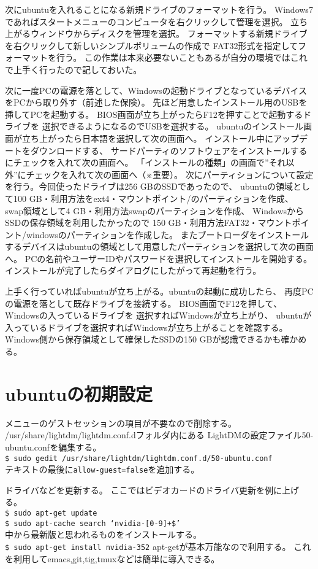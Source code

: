 次にubuntuを入れることになる新規ドライブのフォーマットを行う。
Windows7であればスタートメニューのコンピュータを右クリックして管理を選択。
立ち上がるウィンドウからディスクを管理を選択。
フォーマットする新規ドライブを右クリックして新しいシンプルボリュームの作成で
FAT32形式を指定してフォーマットを行う。
この作業は本来必要ないこともあるが自分の環境ではこれで上手く行ったので記しておいた。

次に一度PCの電源を落として、Windowsの起動ドライブとなっているデバイスをPCから取り外す（前述した保険）。
先ほど用意したインストール用のUSBを挿してPCを起動する。
BIOS画面が立ち上がったらF12を押すことで起動するドライブを
選択できるようになるのでUSBを選択する。
ubuntuのインストール画面が立ち上がったら日本語を選択して次の画面へ。
インストール中にアップデートをダウンロードする、
サードパーティのソフトウェアをインストールするにチェックを入れて次の画面へ。
「インストールの種類」の画面で''それ以外''にチェックを入れて次の画面へ（※重要）。
次にパーティションについて設定を行う。今回使ったドライブは256 GBのSSDであったので、
ubuntuの領域として100 GB・利用方法をext4・マウントポイント/のパーティションを作成、
swap領域として4 GB・利用方法swapのパーティションを作成、
WindowsからSSDの保存領域を利用したかったので
150 GB・利用方法FAT32・マウントポイント/windowsのパーティションを作成した。
またブートローダをインストールするデバイスはubuntuの領域として用意したパーティションを選択して次の画面へ。
PCの名前やユーザーIDやパスワードを選択してインストールを開始する。
インストールが完了したらダイアログにしたがって再起動を行う。

上手く行っていればubuntuが立ち上がる。ubuntuの起動に成功したら、
再度PCの電源を落として既存ドライブを接続する。
BIOS画面でF12を押して、Windowsの入っているドライブを
選択すればWindowsが立ち上がり、
ubuntuが入っているドライブを選択すればWindowsが立ち上がることを確認する。
Windows側から保存領域として確保したSSDの150 GBが認識できるかも確かめる。

\section{ubuntuの初期設定}
メニューのゲストセッションの項目が不要なので削除する。
/usr/share/lightdm/lightdm.conf.dフォルダ内にある
LightDMの設定ファイル50-ubuntu.confを編集する。\\
\texttt{\$ sudo gedit /usr/share/lightdm/lightdm.conf.d/50-ubuntu.conf}\\
テキストの最後に\texttt{allow-guest=false}を追加する。

ドライバなどを更新する。
ここではビデオカードのドライバ更新を例に上げる。\\
\texttt{\$ sudo apt-get update}\\
\texttt{\$ sudo apt-cache search `nvidia-[0-9]+\$'}\\
中から最新版と思われるものをインストールする。\\
\texttt{\$ sudo apt-get install nvidia-352}
apt-getが基本万能なので利用する。
これを利用してemacs,git,tig,tmuxなどは簡単に導入できる。

